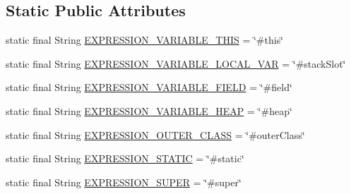 \subsection*{Static Public Attributes}
\begin{DoxyCompactItemize}
\item 
static final String \hyperlink{classgov_1_1nasa_1_1jpf_1_1inspector_1_1common_1_1pse_1_1_p_s_e_variable_af8959a7765f3dfb003455c21f541f7f1}{E\+X\+P\+R\+E\+S\+S\+I\+O\+N\+\_\+\+V\+A\+R\+I\+A\+B\+L\+E\+\_\+\+T\+H\+IS} = \char`\"{}\#this\char`\"{}
\item 
static final String \hyperlink{classgov_1_1nasa_1_1jpf_1_1inspector_1_1common_1_1pse_1_1_p_s_e_variable_a16e15f6de4b00d41b48ba8a53907442d}{E\+X\+P\+R\+E\+S\+S\+I\+O\+N\+\_\+\+V\+A\+R\+I\+A\+B\+L\+E\+\_\+\+L\+O\+C\+A\+L\+\_\+\+V\+AR} = \char`\"{}\#stack\+Slot\char`\"{}
\item 
static final String \hyperlink{classgov_1_1nasa_1_1jpf_1_1inspector_1_1common_1_1pse_1_1_p_s_e_variable_ab3f12265123f287c0404aa928152edc4}{E\+X\+P\+R\+E\+S\+S\+I\+O\+N\+\_\+\+V\+A\+R\+I\+A\+B\+L\+E\+\_\+\+F\+I\+E\+LD} = \char`\"{}\#field\char`\"{}
\item 
static final String \hyperlink{classgov_1_1nasa_1_1jpf_1_1inspector_1_1common_1_1pse_1_1_p_s_e_variable_a65ca865249b5324ab8b1c93773774c49}{E\+X\+P\+R\+E\+S\+S\+I\+O\+N\+\_\+\+V\+A\+R\+I\+A\+B\+L\+E\+\_\+\+H\+E\+AP} = \char`\"{}\#heap\char`\"{}
\item 
static final String \hyperlink{classgov_1_1nasa_1_1jpf_1_1inspector_1_1common_1_1pse_1_1_p_s_e_variable_a0353bceb87ab57d70c3466df4f153c6a}{E\+X\+P\+R\+E\+S\+S\+I\+O\+N\+\_\+\+O\+U\+T\+E\+R\+\_\+\+C\+L\+A\+SS} = \char`\"{}\#outer\+Class\char`\"{}
\item 
static final String \hyperlink{classgov_1_1nasa_1_1jpf_1_1inspector_1_1common_1_1pse_1_1_p_s_e_variable_a633058c65be360292bd37c068ef5a4ce}{E\+X\+P\+R\+E\+S\+S\+I\+O\+N\+\_\+\+S\+T\+A\+T\+IC} = \char`\"{}\#static\char`\"{}
\item 
static final String \hyperlink{classgov_1_1nasa_1_1jpf_1_1inspector_1_1common_1_1pse_1_1_p_s_e_variable_a50ddc6bebf28a3d4493b7214976a61ff}{E\+X\+P\+R\+E\+S\+S\+I\+O\+N\+\_\+\+S\+U\+P\+ER} = \char`\"{}\#super\char`\"{}
\end{DoxyCompactItemize}
